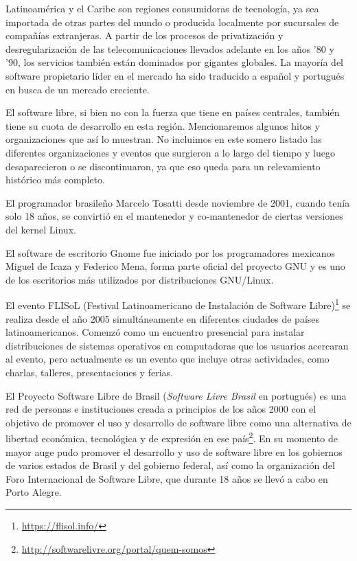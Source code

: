 
Latinoamérica y el Caribe son regiones consumidoras de tecnología, ya sea importada de otras partes del mundo o producida localmente por sucursales de compañías extranjeras. A partir de los procesos de privatización y desregularización de las telecomunicaciones llevados adelante en los años '80 y '90, los servicios también están dominados por gigantes globales. La mayoría del software propietario líder en el mercado ha sido traducido a español y portugués en busca de un mercado creciente.

El software libre, si bien no con la fuerza que tiene en países centrales, también tiene su cuota de desarrollo en esta región. Mencionaremos algunos hitos y organizaciones que así lo muestran. No incluimos en este somero listado las diferentes organizaciones y eventos que surgieron a lo largo del tiempo y luego desaparecieron o se discontinuaron, ya que eso queda para un relevamiento histórico más completo.

El programador brasileño Marcelo Tosatti desde noviembre de 2001, cuando tenía solo 18 años, se convirtió en el mantenedor y co-mantenedor de ciertas versiones del kernel Linux. 

El software de escritorio Gnome fue iniciado por los programadores mexicanos Miguel de Icaza y Federico Mena, forma parte oficial del proyecto GNU y es uno de los escritorios más utilizados por distribuciones GNU/Linux.

El evento FLISoL (Festival Latinoamericano de Instalación de Software Libre)\footnote{\url{https://flisol.info/}} se realiza desde el año 2005 simultáneamente en diferentes ciudades de países latinoamericanos. Comenzó como un encuentro presencial para instalar distribuciones de sistemas operativos en computadoras que los usuarios acercaran al evento, pero actualmente es un evento que incluye otras actividades, como charlas, talleres, presentaciones y ferias.

El Proyecto Software Libre de Brasil (\emph{Software Livre Brasil} en portugués) es una red de personas e instituciones creada a principios de los años 2000 con el objetivo de promover el uso y desarrollo de software libre como una alternativa de libertad económica, tecnológica y de expresión en ese país\footnote{\url{http://softwarelivre.org/portal/quem-somos}}. En su momento de mayor auge pudo promover el desarrollo y uso de software libre en los gobiernos de varios estados de Brasil y del gobierno federal, así como la organización del Foro Internacional de Software Libre, que durante 18 años se llevó a cabo en Porto Alegre.



